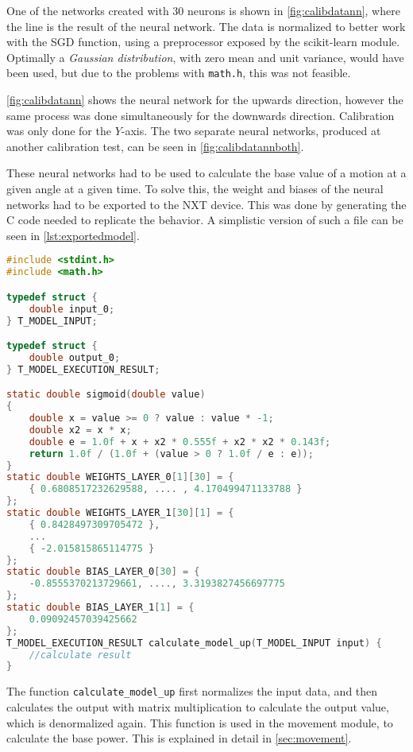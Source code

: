 One of the networks created with 30 neurons is shown in \autoref{fig:calibdatann}, where the line is the result of the neural network.
The data is normalized to better work with the SGD function, using a preprocessor exposed by the scikit-learn module.
Optimally a \textit{Gaussian distribution}, with zero mean and unit variance, would have been used, but due to the problems with \texttt{math{.}h}, this was not feasible.


\autoref{fig:calibdatann} shows the neural network for the upwards direction, however the same process was done simultaneously for the downwards direction.
Calibration was only done for the $Y$-axis.
The two separate neural networks, produced at another calibration test, can be seen in \autoref{fig:calibdatannboth}.



These neural networks had to be used to calculate the base value of a motion at a given angle at a given time.
To solve this, the weight and biases of the neural networks had to be exported to the NXT device.
This was done by generating the C code needed to replicate the behavior.
A simplistic version of such a file can be seen in \autoref{lst:exportedmodel}.


\begin{lstlisting}[language=C,label={lst:exportedmodel},firstnumber={1},caption={Autogenerated model for getting power to move up}]
#include <stdint.h>
#include <math.h>

typedef struct {
	double input_0;
} T_MODEL_INPUT;

typedef struct {
	double output_0;
} T_MODEL_EXECUTION_RESULT;

static double sigmoid(double value)
{
	double x = value >= 0 ? value : value * -1;
	double x2 = x * x;
	double e = 1.0f + x + x2 * 0.555f + x2 * x2 * 0.143f;
	return 1.0f / (1.0f + (value > 0 ? 1.0f / e : e));
}
static double WEIGHTS_LAYER_0[1][30] = {
	{ 0.6808517232629588, .... , 4.170499471133788 }
};
static double WEIGHTS_LAYER_1[30][1] = {
	{ 0.8428497309705472 },
	...
	{ -2.015815865114775 }
};
static double BIAS_LAYER_0[30] = {
	-0.8555370213729661, ...., 3.3193827456697775
};
static double BIAS_LAYER_1[1] = {
	0.09092457039425662
};
T_MODEL_EXECUTION_RESULT calculate_model_up(T_MODEL_INPUT input) {
	//calculate result
}

\end{lstlisting}
The function \texttt{calculate\_model\_up} first normalizes the input data, and then calculates the output with matrix multiplication to calculate the output value, which is denormalized again.
This function is used in the movement module, to calculate the base power.
This is explained in detail in \autoref{sec:movement}.


